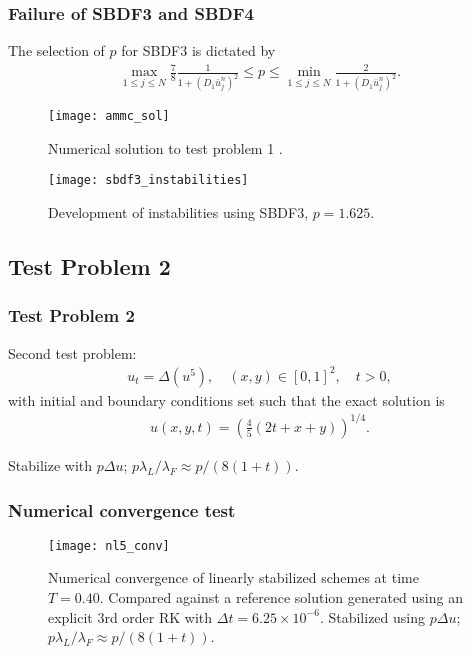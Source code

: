 \documentclass[hyperref={pdfpagelabels=false}]{beamer}
\begin{document}
\begin{frame}
	\frametitle{Failure of SBDF3 and SBDF4} 
The selection of $p$ for SBDF3 is dictated by 
	\begin{align*}
		\max_{1\leq j\leq N} \frac{7}{8} \frac{1}{1 + (D_1 \bar u^n_j)^2} 
		\leq p
		\leq \min_{1\leq j\leq N} \frac{2}{1 + (D_1 \bar u^n_j)^2}.
	\end{align*}
	\begin{figure}
		\centering 
\begin{minipage}{0.45\textwidth} 
	\centering
        \texttt{[image: ammc\_sol]}
	\caption{Numerical solution to test problem 1 .}
\end{minipage}
\begin{minipage}{0.45\textwidth} 
	\centering
	\texttt{[image: sbdf3\_instabilities]}
	\caption{Development of instabilities using SBDF3, $p=1.625$.}
\end{minipage} 
	\end{figure}
\end{frame}

\subsection{Test Problem 2}
\begin{frame}
	\frametitle{Test Problem 2} 
Second test problem: 
	\begin{align*}
		u_t = \Delta(u^5), 
		\quad (x,y) \in [0,1]^2, \quad t > 0, 
	\end{align*}
with initial and boundary conditions set such that the exact solution is 
	\begin{align*}
		u(x,y,t) = \left(\frac{4}{5}(2t+x+y) \right)^{1/4}.
	\end{align*}
	
Stabilize with $p\Delta u$; $p\lambda_L/\lambda_F \approx p/(8(1+t))$.
\end{frame}

\begin{frame}
	\frametitle{Numerical convergence test}
	\begin{figure}[t]
		\centering
		\texttt{[image: nl5\_conv]}
		\caption{Numerical convergence of linearly stabilized schemes at time $T=0.40$. Compared against a reference solution generated using an explicit 3rd order RK with $\Delta t = 6.25\times 10^{-6}$. Stabilized using $p\Delta u$; $p\lambda_L / \lambda_F \approx p/(8(1+t))$.}
	\end{figure} 
\end{frame}
\end{document}
